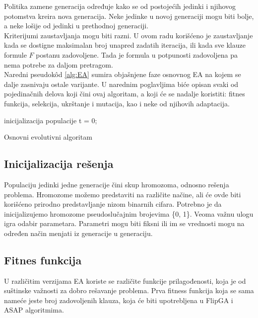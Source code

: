 \documentclass[a4paper]{article}
\begin{document}
Politika zamene generacija određuje kako se od postojećih jedinki i 
njihovog potomstva kreira nova generacija. Neke jedinke u novoj generaciji mogu biti bolje,
a neke lošije od jedinki u prethodnoj generaciji. \\

Kriterijumi zaustavljanja mogu biti razni. U ovom radu korišćeno je zaustavljanje 
kada se dostigne maksimalan broj unapred zadatih iteracija, ili kada sve klauze 
formule $F$ postanu zadovoljene. 
Tada je formula u potpunosti zadovoljena pa nema potrebe za daljom pretragom.\\

Naredni pseudok\^ od \ref{alg:EA} sumira objašnjene faze osnovnog EA na kojem se dalje
zasnivaju ostale varijante. U narednim poglavljima biće opisan 
svaki od pojedinačnih delova koji čini ovaj algoritam, a koji će se nadalje koristiti: 
fitnes funkcija, selekcija, ukrštanje i mutacija, kao i neke od njihovih adaptacija.\\

\begin{algorithm}[H]
\SetAlgoLined
{}

\BlankLine
 inicijalizacija populacije\;
 t = 0; \\
\caption{Osnovni evolutivni algoritam}\label{alg:EA}
\end{algorithm}


\subsection{Inicijalizacija rešenja}
\label{sec:ea_init}
Populaciju jedinki jedne generacije čini skup hromozoma, odnosno rešenja problema.
Hromozome možemo predstaviti na različite načine, ali će ovde biti korišćeno
prirodno predstavljanje nizom binarnih cifara.
Potrebno je da inicijalizujemo hromozome pseudoslučajnim brojevima \{0, 1\}.
Veoma važnu ulogu igra odabir parametara. Parametri mogu biti fiksni ili im se vrednosti 
mogu na određen način menjati iz generacije u generaciju.


\subsection{Fitnes funkcija}
\label{sec:ea_fitness}
U različitim verzijama EA koriste se različite funkcije prilagođenosti, koja je od suštinske
važnosti za dobro rešavanje problema. 
Prva fitness funkcija koja se sama nameće jeste broj zadovoljenih klauza, 
koja će biti upotrebljena u FlipGA i ASAP algoritmima.
\end{document}
